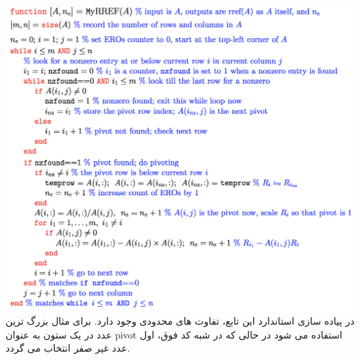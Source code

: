 \documentclass{article}
\begin{document}
\includegraphics[scale=0.8]{code}
در پیاده سازی استاندارد این تابع، تفاوت های محدودی وجود دارد. برای مثال بزرگ ترین عدد در یک ستون به عنوان pivot استفاده می شود در حالی که در شبه کد فوق، اول عدد غیر صفر انتخاب می گردد.
\clearpage
\end{document}
